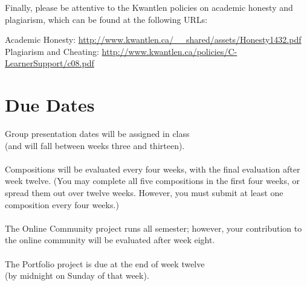 \documentclass[letterpaper,10pt,headsepline]{scrreprt}
\begin{document}
Finally, please be attentive to the Kwantlen policies on academic honesty and plagiarism, which can be found at the following URLs:

\noindent
Academic Honesty: \url{http://www.kwantlen.ca/__shared/assets/Honesty1432.pdf}\\
Plagiarism and Cheating: \url{http://www.kwantlen.ca/policies/C-LearnerSupport/c08.pdf}
\clearpage
\section{Due Dates}

Group presentation dates will be assigned in class \\(and will fall between weeks three and thirteen).
\\
\noindent\\
Compositions will be evaluated every four weeks, with the final evaluation after week twelve. (You may complete all five compositions in the first four weeks, or spread them out over twelve weeks. However, you must submit at least one composition every four weeks.)\\
\noindent\\
The Online Community project runs all semester; however, your contribution to the online community will be evaluated after week eight.\\
\noindent\\
The Portfolio project is due at the end of week twelve \\(by midnight on Sunday of that week).
\end{document}
